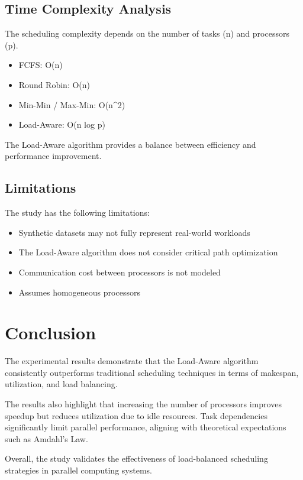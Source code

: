 \documentclass[12pt,a4paper]{article}
\begin{document}
\subsection*{Time Complexity Analysis}

The scheduling complexity depends on the number of tasks (n) and processors (p).

\begin{itemize}
\item FCFS: O(n)
\item Round Robin: O(n)
\item Min-Min / Max-Min: O(n^2)
\item Load-Aware: O(n log p)
\end{itemize}

The Load-Aware algorithm provides a balance between efficiency and performance improvement.

\subsection*{Limitations}

The study has the following limitations:

\begin{itemize}
\item Synthetic datasets may not fully represent real-world workloads
\item The Load-Aware algorithm does not consider critical path optimization
\item Communication cost between processors is not modeled
\item Assumes homogeneous processors
\end{itemize}

\newpage
\section{Conclusion}

The experimental results demonstrate that the Load-Aware algorithm consistently outperforms traditional scheduling techniques in terms of makespan, utilization, and load balancing.

The results also highlight that increasing the number of processors improves speedup but reduces utilization due to idle resources. Task dependencies significantly limit parallel performance, aligning with theoretical expectations such as Amdahl{’}s Law.

Overall, the study validates the effectiveness of load-balanced scheduling strategies in parallel computing systems.
\end{document}
